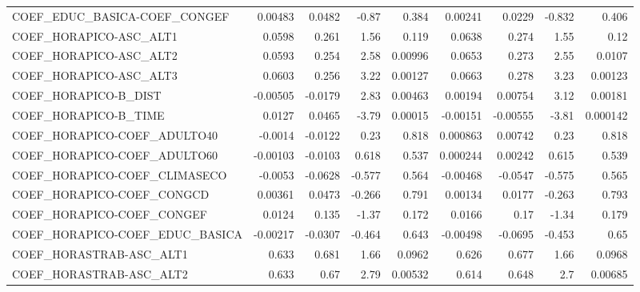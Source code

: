 \begin{tabular}{lrrrrrrrr}
COEF\_EDUC\_BASICA-COEF\_CONGEF      &     0.00483 &       0.0482 &   -0.87 &    0.384 &    0.00241 &      0.0229 &       -0.832 &         0.406 \\
COEF\_HORAPICO-ASC\_ALT1            &      0.0598 &        0.261 &    1.56 &    0.119 &     0.0638 &       0.274 &         1.55 &          0.12 \\
COEF\_HORAPICO-ASC\_ALT2            &      0.0593 &        0.254 &    2.58 &  0.00996 &     0.0653 &       0.273 &         2.55 &        0.0107 \\
COEF\_HORAPICO-ASC\_ALT3            &      0.0603 &        0.256 &    3.22 &  0.00127 &     0.0663 &       0.278 &         3.23 &       0.00123 \\
COEF\_HORAPICO-B\_DIST              &    -0.00505 &      -0.0179 &    2.83 &  0.00463 &    0.00194 &     0.00754 &         3.12 &       0.00181 \\
COEF\_HORAPICO-B\_TIME              &      0.0127 &       0.0465 &   -3.79 &  0.00015 &   -0.00151 &    -0.00555 &        -3.81 &      0.000142 \\
COEF\_HORAPICO-COEF\_ADULTO40       &     -0.0014 &      -0.0122 &    0.23 &    0.818 &   0.000863 &     0.00742 &         0.23 &         0.818 \\
COEF\_HORAPICO-COEF\_ADULTO60       &    -0.00103 &      -0.0103 &   0.618 &    0.537 &   0.000244 &     0.00242 &        0.615 &         0.539 \\
COEF\_HORAPICO-COEF\_CLIMASECO      &     -0.0053 &      -0.0628 &  -0.577 &    0.564 &   -0.00468 &     -0.0547 &       -0.575 &         0.565 \\
COEF\_HORAPICO-COEF\_CONGCD         &     0.00361 &       0.0473 &  -0.266 &    0.791 &    0.00134 &      0.0177 &       -0.263 &         0.793 \\
COEF\_HORAPICO-COEF\_CONGEF         &      0.0124 &        0.135 &   -1.37 &    0.172 &     0.0166 &        0.17 &        -1.34 &         0.179 \\
COEF\_HORAPICO-COEF\_EDUC\_BASICA    &    -0.00217 &      -0.0307 &  -0.464 &    0.643 &   -0.00498 &     -0.0695 &       -0.453 &          0.65 \\
COEF\_HORASTRAB-ASC\_ALT1           &       0.633 &        0.681 &    1.66 &   0.0962 &      0.626 &       0.677 &         1.66 &        0.0968 \\
COEF\_HORASTRAB-ASC\_ALT2           &       0.633 &         0.67 &    2.79 &  0.00532 &      0.614 &       0.648 &          2.7 &       0.00685 \\

\end{tabular}
